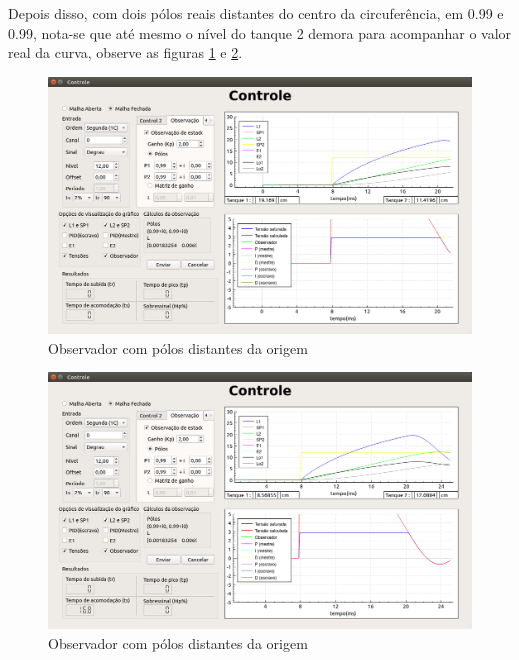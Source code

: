\documentclass[a4paper,12pt]{article}
\begin{document}
\newpage
\hspace{4ex}Depois disso, com dois pólos reais distantes do centro da circuferência, em 0.99 e 0.99, nota-se que até mesmo o nível do tanque 2 demora para acompanhar o valor real da curva, observe as figuras \ref{img5} e \ref{img6}.
\begin{figure}[!h]
\centering
\includegraphics[width=13cm]{FotosObservador/PolosMuitoLentos1}
\caption{Observador com pólos distantes da origem}
\label{img5}
\end{figure}
\begin{figure}[!h]
\centering
\includegraphics[width=13cm]{FotosObservador/PolosMuitoLentos2}
\caption{Observador com pólos distantes da origem}
\label{img6}
\end{figure}
\end{document}
